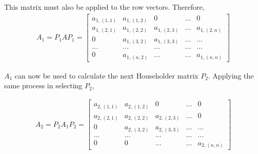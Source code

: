 \documentclass{article}
\begin{document}
		
		This matrix must also be applied to the row vectors.  Therefore, 
		\begin{align*}
		A_{1}=P_{1}AP_{1}=
		\begin{bmatrix}
		a_{1,(1,1)} & a_{1,(1,2)} & 0 & ... & 0\\
		a_{1,(2,1)} & a_{1,(2,2)} & a_{1,(2,3)} & ... & a_{1,(2,n)} \\
		0 & a_{1,(3,2)} & a_{1,(3,3)} & ... & ... \\
		... & ... & ... & ... & ...\\
		0 & a_{1,(n,2)} & ... & ... & a_{1,(n,n)}
		\end{bmatrix}
		\end{align*}
		
		$A_{1}$ can now be used to calculate the next Householder matrix $P_{2}$.  Applying the same process in selecting $P_{2}$,

		\begin{align*}
		A_{2}=P_{2}A_{1}P_{2}=
		\begin{bmatrix}
		a_{2,(1,1)} & a_{2,(1,2)} & 0 & ... & 0\\
		a_{2,(2,1)} & a_{2,(2,2)} & a_{2,(2,3)} & ... & 0 \\
		0 & a_{2,(3,2)} & a_{2,(3,3)} & ... & ... \\
		... & ... & ... & ... & ...\\
		0 & 0 & ... & ... & a_{2,(n,n)}
		\end{bmatrix}
		\end{align*}
		
\end{document}
